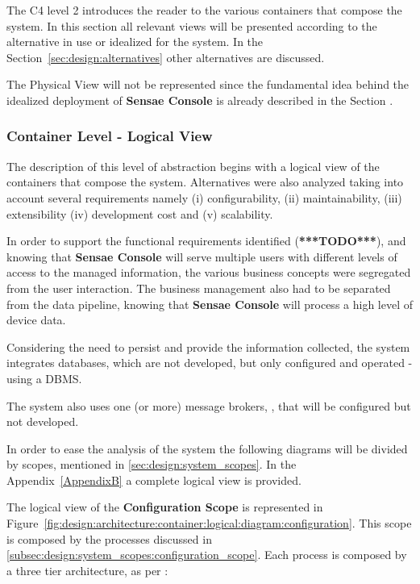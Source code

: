 The C4 level 2 introduces the reader to the various containers that compose the system. In this section all relevant views will be presented according to the alternative in use or idealized for the system. In the Section~\ref{sec:design:alternatives} other alternatives are discussed. 

The Physical View will not be represented since the fundamental idea behind the idealized deployment of \textbf{Sensae Console} is already described in the Section .

\subsubsection*{Container Level - Logical View}
\label{subsubsec:design:architecture:container:logical}

The description of this level of abstraction begins with a logical view of the containers that compose the system. Alternatives were also analyzed taking into account several requirements namely (i) configurability, (ii) maintainability, (iii) extensibility (iv) development cost and (v) scalability.

In order to support the functional requirements identified (\textbf{***TODO***}), and knowing that \textbf{Sensae Console} will serve multiple users with different levels of access to the managed information, the various business concepts were segregated from the user interaction. The business management also had to be separated from the  data pipeline, knowing that \textbf{Sensae Console} will process a high level of device data.

Considering the need to persist and provide the information collected, the system integrates databases, which are not developed, but only configured and operated - using a \gls{DBMS}.

The system also uses one (or more) message brokers, \cite{broker}, that will be configured but not developed.

In order to ease the analysis of the system the following diagrams will be divided by scopes, mentioned in \ref{sec:design:system_scopes}. In the Appendix~\ref{AppendixB} a complete logical view is provided.

The logical view of the \textbf{Configuration Scope} is represented in Figure~\ref{fig:design:architecture:container:logical:diagram:configuration}. This scope is composed by the processes discussed in \ref{subsec:design:system_scopes:configuration_scope}. Each process is composed by a three tier architecture, as per \cite{3tier}:

